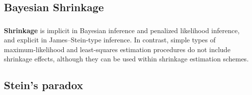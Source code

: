 \documentclass[c, dvipsnames]{beamer}  %
\begin{document}
%
%
%
%
%
%
%
%
%
%
%
%
%
%
%


\subsection{Bayesian Shrinkage}


\begin{frame}[shrink=5]
\frametitle{\insertsection} 
\framesubtitle{\insertsubsection}

\textbf{Shrinkage} is implicit in Bayesian inference and penalized likelihood inference, and explicit in James–Stein-type inference. In contrast, simple types of maximum-likelihood and least-squares estimation procedures do not include shrinkage effects, although they can be used within shrinkage estimation schemes.
 
 
 
\end{frame}

\subsection{Stein's  paradox}
\end{document}
